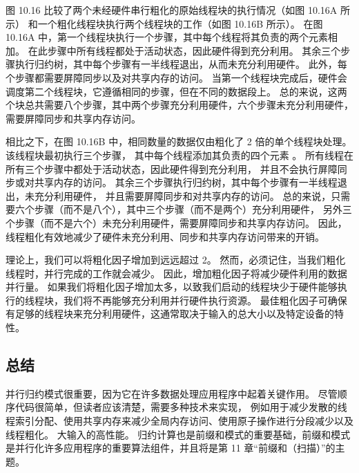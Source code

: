 图 10.16 比较了两个未经硬件串行粗化的原始线程块的执行情况（如图 10.16A 所示）
和一个粗化线程块执行两个线程块的工作（如图 10.16B 所示）。 
在图 10.16A 中，第一个线程块执行一个步骤，其中每个线程将其负责的两个元素相加。 
在此步骤中所有线程都处于活动状态，因此硬件得到充分利用。 
其余三个步骤执行归约树，其中每个步骤有一半线程退出，从而未充分利用硬件。 
此外，每个步骤都需要屏障同步以及对共享内存的访问。 
当第一个线程块完成后，硬件会调度第二个线程块，它遵循相同的步骤，但在不同的数据段上。 
总的来说，这两个块总共需要八个步骤，其中两个步骤充分利用硬件，六个步骤未充分利用硬件，需要屏障同步和共享内存访问。

相比之下，在图 10.16B 中，相同数量的数据仅由粗化了 2 倍的单个线程块处理。该线程块最初执行三个步骤，
其中每个线程添加其负责的四个元素 。 所有线程在所有三个步骤中都处于活动状态，因此硬件得到充分利用，
并且不会执行屏障同步或对共享内存的访问。 其余三个步骤执行归约树，其中每个步骤有一半线程退出，未充分利用硬件，
并且需要屏障同步和对共享内存的访问。 总的来说，只需要六个步骤（而不是八个），其中三个步骤（而不是两个）充分利用硬件，
另外三个步骤（而不是六个）未充分利用硬件，需要屏障同步和共享内存访问。 
因此，线程粗化有效地减少了硬件未充分利用、同步和共享内存访问带来的开销。

理论上，我们可以将粗化因子增加到远远超过 2。 然而，必须记住，当我们粗化线程时，并行完成的工作就会减少。 
因此，增加粗化因子将减少硬件利用的数据并行量。 
如果我们将粗化因子增加太多，以致我们启动的线程块少于硬件能够执行的线程块，我们将不再能够充分利用并行硬件执行资源。 
最佳粗化因子可确保有足够的线程块来充分利用硬件，这通常取决于输入的总大小以及特定设备的特性。

\subsection{总结}
并行归约模式很重要，因为它在许多数据处理应用程序中起着关键作用。 尽管顺序代码很简单，但读者应该清楚，需要多种技术来实现，
例如用于减少发散的线程索引分配、使用共享内存来减少全局内存访问、使用原子操作进行分段减少以及线程粗化。 大输入的高性能。 
归约计算也是前缀和模式的重要基础，前缀和模式是并行化许多应用程序的重要算法组件，并且将是第 11 章“前缀和（扫描）”的主题。